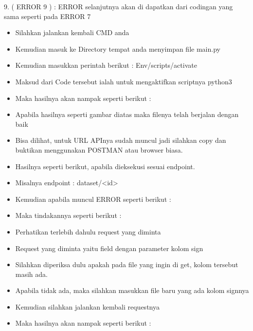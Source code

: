 9. ( ERROR 9 ) : 
ERROR selanjutnya akan di dapatkan dari codingan yang sama seperti pada ERROR 7 
\begin{itemize}
\item Silahkan jalankan kembali CMD anda 
\item Kemudian masuk ke Directory tempat anda menyimpan file main.py 
\item Kemudian masukkan perintah berikut : Env/scripts/activate 
\item Maksud dari Code tersebut ialah untuk mengaktifkan scriptnya python3 
\item Maka hasilnya akan nampak seperti berikut : 
\item Apabila hasilnya seperti gambar diatas maka filenya telah berjalan dengan baik 
\item Bisa dilihat, untuk URL APInya sudah muncul jadi silahkan copy dan buktikan menggunakan POSTMAN atau browser biasa. 
\item Hasilnya seperti berikut, apabila dieksekusi sesuai endpoint. 
\item Misalnya endpoint : dataset/<id> 
\item Kemudian apabila muncul ERROR seperti berikut : 
\item Maka tindakannya seperti berikut : 
\item Perhatikan terlebih dahulu request yang diminta 
\item Request yang diminta yaitu field dengan parameter kolom sign 
\item Silahkan diperiksa dulu apakah pada file yang ingin di get, kolom tersebut masih ada. 
\item Apabila tidak ada, maka silahkan masukkan file baru yang ada kolom signnya 
\item Kemudian silahkan jalankan kembali requestnya 
\item Maka hasilnya akan nampak seperti berikut : 
\end{itemize}
